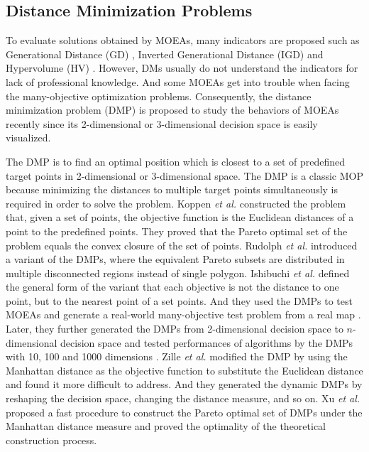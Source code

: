 \documentclass[preprint,12pt]{elsarticle}
\begin{document}
\subsection{Distance Minimization Problems} \label{subsec:Distance Minimizaton Problems}

To evaluate solutions obtained by MOEAs, many indicators are proposed such as Generational Distance (GD) \cite{van2000measuring}, Inverted Generational Distance (IGD) \cite{zhang2008multiobjective} and Hypervolume (HV) \cite{zitzler1999multiobjective}.
However, DMs usually do not understand the indicators for lack of professional knowledge.
And some MOEAs get into trouble when facing the many-objective optimization problems.
Consequently, the distance minimization problem (DMP) is proposed to study the behaviors of MOEAs recently since its 2-dimensional or 3-dimensional decision space is easily visualized.

The DMP is to find an optimal position which is closest to a set of predefined target points in 2-dimensional or 3-dimensional space. 
The DMP is a classic MOP because minimizing the distances to multiple target points simultaneously is required in order to solve the problem.
Koppen \textit{et al.} \cite{Koppen2007} constructed the problem that, given a set of points, the objective function is the Euclidean distances of a point to the predefined points. They proved that the Pareto optimal set of the problem equals the convex closure of the set of points.
Rudolph \textit{et al.} \cite{Rudolph2007} introduced a variant of the DMPs, where the equivalent Pareto subsets are distributed in multiple disconnected regions instead of single polygon.
Ishibuchi \textit{et al.} \cite{Ishibuchi2010} defined the general form of the variant that each objective is not the distance to one point, but to the nearest point of a set points.
And they used the DMPs to test MOEAs and generate a real-world many-objective test problem from a real map \cite{Ishibuchi2011}.
Later, they further generated the DMPs from 2-dimensional decision space to $n$-dimensional decision space and tested performances of algorithms by the DMPs with 10, 100 and 1000 dimensions \cite{Ishibuchi2013}.
Zille \textit{et al.} \cite{Zille2015} modified the DMP by using the Manhattan distance as the objective function to substitute the Euclidean distance and found it more difficult to address.
And they generated the dynamic DMPs by reshaping the decision space, changing the distance measure, and so on.
Xu \textit{et al.} \cite{Xu2015} proposed a fast procedure to construct the Pareto optimal set of DMPs under the Manhattan distance measure and proved the optimality of the theoretical construction process.
\end{document}
